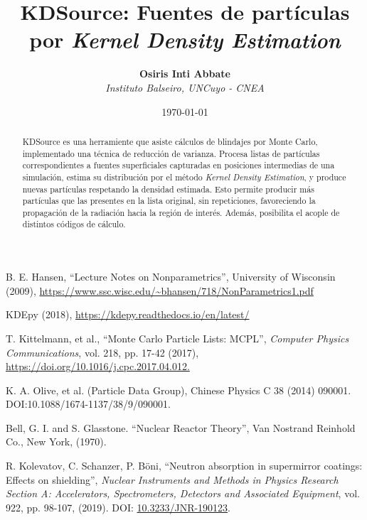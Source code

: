 \documentclass[11pt]{article}
\title{\textbf{KDSource: Fuentes de partículas por \emph{Kernel Density Estimation}} \vspace{4mm} }
\author{
    \textbf{Osiris Inti Abbate} \vspace{2mm} \\
    \textit{Instituto Balseiro, UNCuyo - CNEA}
}
\date{\today}
\begin{document}
\maketitle

\begin{abstract}

KDSource es una herramiente que asiste cálculos de blindajes por Monte Carlo, implementado una técnica de reducción de varianza. Procesa listas de partículas correspondientes a fuentes superficiales capturadas en posiciones intermedias de una simulación, estima su distribución por el método \emph{Kernel Density Estimation}, y produce nuevas partículas respetando la densidad estimada. Esto permite producir más partículas que las presentes en la lista original, sin repeticiones, favoreciendo la propagación de la radiación hacia la región de interés. Además, posibilita el acople de distintos códigos de cálculo.

\end{abstract}





\begin{thebibliography}{9}

     B. E. Hansen, ``Lecture Notes on Nonparametrics'', University of Wisconsin (2009), \url{https://www.ssc.wisc.edu/~bhansen/718/NonParametrics1.pdf}

     KDEpy (2018), \url{https://kdepy.readthedocs.io/en/latest/}

     T. Kittelmann, et al., ``Monte Carlo Particle Lists: MCPL'', \emph{Computer Physics Communications}, vol. 218, pp. 17-42 (2017), \url{https://doi.org/10.1016/j.cpc.2017.04.012.}

     K. A. Olive, et al. (Particle Data Group), Chinese Physics C 38 (2014) 090001. DOI:10.1088/1674-1137/38/9/090001.

     Bell, G. I. and S. Glasstone. ``Nuclear Reactor Theory'', Van Nostrand Reinhold Co., New York, (1970).

     R. Kolevatov, C. Schanzer, P. Böni, ``Neutron absorption in supermirror coatings: Effects on shielding'', \textit{Nuclear Instruments and Methods in Physics Research Section A: Accelerators, Spectrometers, Detectors and Associated Equipment}, vol. 922, pp. 98-107, (2019). DOI: \href{https://doi.org/10.1016/j.nima.2013.04.051}{10.3233/JNR-190123}.
\end{thebibliography}

\begin{appendices}
    
\end{appendices}
\end{document}
